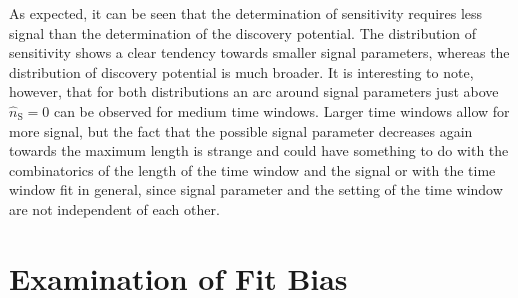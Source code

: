As expected, it can be seen that the determination of sensitivity requires less signal than the determination of the discovery potential.
The distribution of sensitivity shows a clear tendency towards smaller signal parameters, whereas the distribution of discovery potential is much broader.
It is interesting to note, however, that for both distributions an arc around signal parameters just above $\hat{n}_\text{S}=0$ can be observed for medium time windows.
Larger time windows allow for more signal, but the fact that the possible signal parameter decreases again towards the maximum length is strange and could have something to do with the combinatorics of the length of the time window and the signal or with the time window fit in general, since signal parameter and the setting of the time window are not independent of each other.

\section{Examination of Fit Bias}

